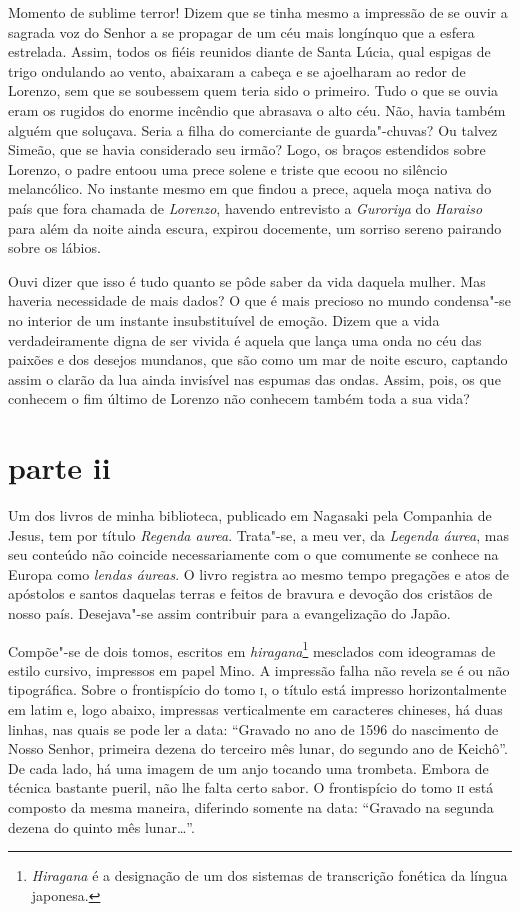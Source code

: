 Momento de sublime terror! Dizem que se tinha mesmo a impressão de se
ouvir a sagrada voz do Senhor a se propagar de um céu mais longínquo
que a esfera estrelada. Assim, todos os fiéis reunidos diante de Santa
Lúcia, qual espigas de trigo ondulando ao vento, abaixaram a cabeça e
se ajoelharam ao redor de Lorenzo, sem que se soubessem quem teria sido  
o primeiro. Tudo o que se ouvia eram os rugidos do enorme incêndio que
abrasava o alto céu. Não, havia também alguém que soluçava. Seria a
filha do comerciante de guarda"-chuvas? Ou talvez Simeão, que se havia
considerado seu irmão? Logo, os braços estendidos sobre Lorenzo, o
padre entoou uma prece solene e triste que ecoou no silêncio
melancólico. No instante mesmo em que findou a prece, aquela moça
nativa do país que fora chamada de \textit{Lorenzo}, havendo entrevisto a
\textit{Guroriya} do \textit{Haraiso} para além da noite ainda escura,
expirou docemente, um sorriso sereno pairando sobre os lábios.

Ouvi dizer que isso é tudo quanto se pôde saber da vida daquela mulher.
Mas haveria necessidade de mais dados? O que é mais precioso no mundo
condensa"-se no interior de um instante insubstituível de emoção. Dizem
que a vida verdadeiramente digna de ser vivida é aquela que lança uma
onda no céu das paixões e dos desejos mundanos, que são como um mar de
noite escuro, captando assim o clarão da lua ainda invisível nas
espumas das ondas. Assim, pois, os que conhecem o fim último de Lorenzo
não conhecem também toda a sua vida?

\section*{parte ii}

Um dos livros de minha biblioteca, publicado em Nagasaki pela Companhia
de Jesus, tem por título \textit{Regenda aurea}. Trata"-se, a meu ver,
da \textit{Legenda áurea}, mas seu conteúdo não coincide
necessariamente com o que comumente se conhece na Europa como \textit{lendas
áureas}. O livro registra ao mesmo tempo pregações e atos de apóstolos
e santos daquelas terras e feitos de bravura e devoção dos cristãos de 
nosso país. Desejava"-se assim contribuir para a evangelização do Japão.

Compõe"-se de dois tomos, escritos em \textit{hiragana}\footnote{ \textit{Hiragana} é a 
designação de um dos sistemas de transcrição
fonética da língua japonesa.} mesclados com ideogramas de estilo
cursivo, impressos em papel Mino. A impressão falha não revela se é ou
não tipográfica. Sobre o frontispício do tomo \textsc{i}, o título está impresso
horizontalmente em latim e, logo abaixo, impressas verticalmente em
caracteres chineses, há duas linhas, nas quais se pode ler a data:
``Gravado no ano de 1596 do nascimento de Nosso Senhor, primeira dezena
do terceiro mês lunar, do segundo ano de Keichô''. De cada lado, há uma
imagem de um anjo tocando uma trombeta. Embora de técnica bastante
pueril, não lhe falta certo sabor. O frontispício do tomo \textsc{ii} está
composto da mesma maneira, diferindo somente na data: ``Gravado na
segunda dezena do quinto mês lunar\ldots{}''.

